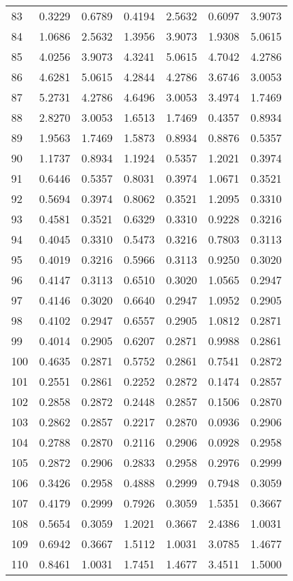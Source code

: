 \begin{center}
\begin{longtable}{lcccccc}
    83 &0.3229&0.6789&0.4194&2.5632&0.6097&3.9073 \\
    84 &1.0686&2.5632&1.3956&3.9073&1.9308&5.0615 \\
    85 &4.0256&3.9073&4.3241&5.0615&4.7042&4.2786 \\
    86 &4.6281&5.0615&4.2844&4.2786&3.6746&3.0053 \\
    87 &5.2731&4.2786&4.6496&3.0053&3.4974&1.7469 \\
    88 &2.8270&3.0053&1.6513&1.7469&0.4357&0.8934 \\
    89 &1.9563&1.7469&1.5873&0.8934&0.8876&0.5357 \\
    90 &1.1737&0.8934&1.1924&0.5357&1.2021&0.3974 \\
    91 &0.6446&0.5357&0.8031&0.3974&1.0671&0.3521 \\
    92 &0.5694&0.3974&0.8062&0.3521&1.2095&0.3310 \\
    93 &0.4581&0.3521&0.6329&0.3310&0.9228&0.3216 \\
    94 &0.4045&0.3310&0.5473&0.3216&0.7803&0.3113 \\
    95 &0.4019&0.3216&0.5966&0.3113&0.9250&0.3020 \\
    96 &0.4147&0.3113&0.6510&0.3020&1.0565&0.2947 \\
    97 &0.4146&0.3020&0.6640&0.2947&1.0952&0.2905 \\
    98 &0.4102&0.2947&0.6557&0.2905&1.0812&0.2871 \\
    99 &0.4014&0.2905&0.6207&0.2871&0.9988&0.2861 \\
    100&0.4635&0.2871&0.5752&0.2861&0.7541&0.2872 \\
    101&0.2551&0.2861&0.2252&0.2872&0.1474&0.2857 \\
    102&0.2858&0.2872&0.2448&0.2857&0.1506&0.2870 \\
    103&0.2862&0.2857&0.2217&0.2870&0.0936&0.2906 \\
    104&0.2788&0.2870&0.2116&0.2906&0.0928&0.2958 \\
    105&0.2872&0.2906&0.2833&0.2958&0.2976&0.2999 \\
    106&0.3426&0.2958&0.4888&0.2999&0.7948&0.3059 \\
    107&0.4179&0.2999&0.7926&0.3059&1.5351&0.3667 \\
    108&0.5654&0.3059&1.2021&0.3667&2.4386&1.0031 \\
    109&0.6942&0.3667&1.5112&1.0031&3.0785&1.4677 \\
    110&0.8461&1.0031&1.7451&1.4677&3.4511&1.5000 \\

\end{longtable}
\end{center}
